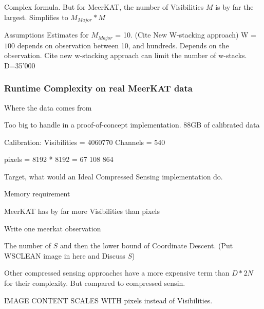 Complex formula. But for MeerKAT, the number of Visibilities $M$ is by far the largest. Simplifies to $M_{Major}*M$

Assumptions
Estimates for $M_{Major}$ = 10. (Cite New W-stacking approach)
W = $100$ depends on observation between 10, and hundreds. Depends on the observation. Cite new w-stacking approach can limit the number of w-stacks. 
D=35'000

\subsubsection{Runtime Complexity on real MeerKAT data}
Where the data comes from

Too big to handle in a proof-of-concept implementation. 88GB of calibrated data

Calibration: 
Visibilities = 4060770
Channels = 540

pixels = 8192 * 8192 = 67 108 864

Target, what would an Ideal Compressed Sensing implementation do.

Memory requirement

MeerKAT has by far more Visibilities than pixels

Write one meerkat observation

The number of $S$ and then the lower bound of Coordinate Descent. (Put WSCLEAN image in here and Discuss $S$)



Other compressed sensing approaches have a more expensive term than $D*2N$ for their complexity. But compared to compressed sensin.


IMAGE CONTENT SCALES WITH pixels instead of Visibilities.


